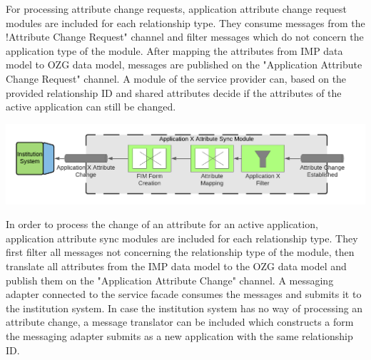 For processing attribute change requests, application attribute change request modules are included for each relationship type. They consume messages from the !Attribute Change Request" channel and filter messages which do not concern the application type of the module. After mapping the attributes from IMP data model to OZG data model, messages are published on the "Application Attribute Change Request" channel. A module of the service provider can, based on the provided relationship ID and shared attributes decide if the attributes of the active application can still be changed. 

\begin{center}
    \includegraphics[scale=0.6]{Diagrams/Integration Architecture 2/Application Attribute Sync Module.pdf}
\end{center}

In order to process the change of an attribute for an active application, application attribute sync modules are included for each relationship type. They first filter all messages not concerning the relationship type of the module, then translate all attributes from the IMP data model to the OZG data model and publish them on the "Application Attribute Change" channel.
A messaging adapter connected to the service facade consumes the messages and submits it to the institution system. In case the institution system has no way of processing an attribute change, a message translator can be included which constructs a form the messaging adapter submits as a new application with the same relationship ID.

